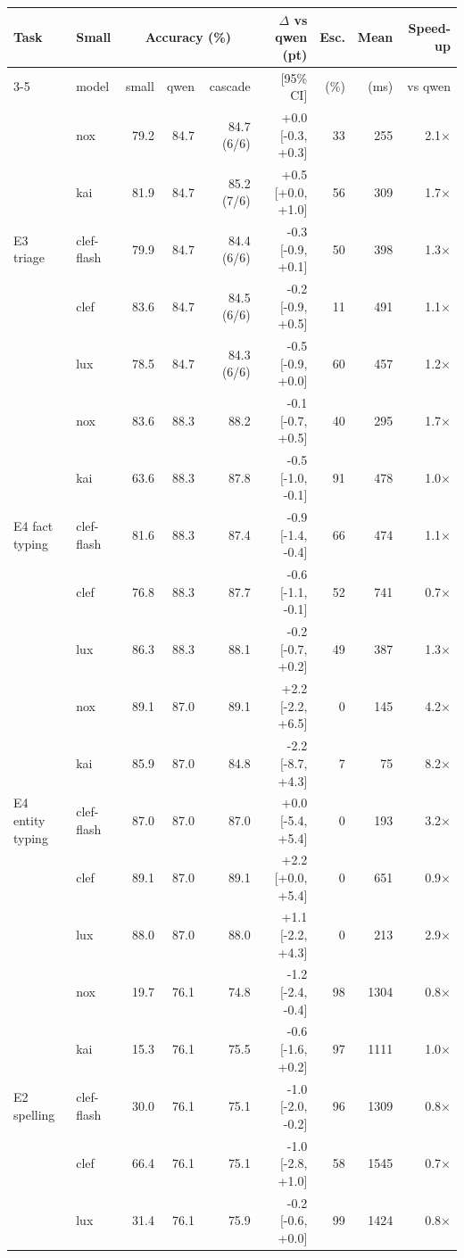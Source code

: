 \begin{tabular}{llrrrrrrr}
\toprule
Task & Small & \multicolumn{3}{c}{Accuracy (\%)} & $\Delta$ vs qwen (pt) & Esc. & Mean & Speed-up \\
\cmidrule(lr){3-5}
 & model & small & qwen & cascade & [95\% CI] & (\%) & (ms) & vs qwen \\
\midrule
\multirow{5}{*}{E3 triage} & nox & 79.2 & 84.7 & 84.7 (6/6) & +0.0 [-0.3, +0.3] & 33 & 255 & 2.1$\times$ \\
 & kai & 81.9 & 84.7 & 85.2 (7/6) & +0.5 [+0.0, +1.0] & 56 & 309 & 1.7$\times$ \\
 & clef-flash & 79.9 & 84.7 & 84.4 (6/6) & -0.3 [-0.9, +0.1] & 50 & 398 & 1.3$\times$ \\
 & clef & 83.6 & 84.7 & 84.5 (6/6) & -0.2 [-0.9, +0.5] & 11 & 491 & 1.1$\times$ \\
 & lux & 78.5 & 84.7 & 84.3 (6/6) & -0.5 [-0.9, +0.0] & 60 & 457 & 1.2$\times$ \\
\midrule
\multirow{5}{*}{E4 fact typing} & nox & 83.6 & 88.3 & 88.2 & -0.1 [-0.7, +0.5] & 40 & 295 & 1.7$\times$ \\
 & kai & 63.6 & 88.3 & 87.8 & -0.5 [-1.0, -0.1] & 91 & 478 & 1.0$\times$ \\
 & clef-flash & 81.6 & 88.3 & 87.4 & -0.9 [-1.4, -0.4] & 66 & 474 & 1.1$\times$ \\
 & clef & 76.8 & 88.3 & 87.7 & -0.6 [-1.1, -0.1] & 52 & 741 & 0.7$\times$ \\
 & lux & 86.3 & 88.3 & 88.1 & -0.2 [-0.7, +0.2] & 49 & 387 & 1.3$\times$ \\
\midrule
\multirow{5}{*}{E4 entity typing} & nox & 89.1 & 87.0 & 89.1 & +2.2 [-2.2, +6.5] & 0 & 145 & 4.2$\times$ \\
 & kai & 85.9 & 87.0 & 84.8 & -2.2 [-8.7, +4.3] & 7 & 75 & 8.2$\times$ \\
 & clef-flash & 87.0 & 87.0 & 87.0 & +0.0 [-5.4, +5.4] & 0 & 193 & 3.2$\times$ \\
 & clef & 89.1 & 87.0 & 89.1 & +2.2 [+0.0, +5.4] & 0 & 651 & 0.9$\times$ \\
 & lux & 88.0 & 87.0 & 88.0 & +1.1 [-2.2, +4.3] & 0 & 213 & 2.9$\times$ \\
\midrule
\multirow{5}{*}{E2 spelling} & nox & 19.7 & 76.1 & 74.8 & -1.2 [-2.4, -0.4] & 98 & 1304 & 0.8$\times$ \\
 & kai & 15.3 & 76.1 & 75.5 & -0.6 [-1.6, +0.2] & 97 & 1111 & 1.0$\times$ \\
 & clef-flash & 30.0 & 76.1 & 75.1 & -1.0 [-2.0, -0.2] & 96 & 1309 & 0.8$\times$ \\
 & clef & 66.4 & 76.1 & 75.1 & -1.0 [-2.8, +1.0] & 58 & 1545 & 0.7$\times$ \\
 & lux & 31.4 & 76.1 & 75.9 & -0.2 [-0.6, +0.0] & 99 & 1424 & 0.8$\times$ \\
\bottomrule
\end{tabular}
